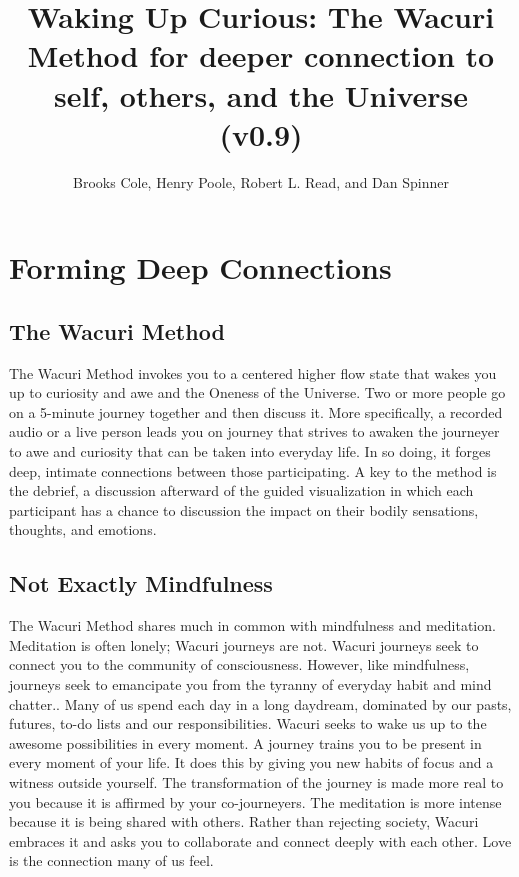 \documentclass[12pt]{book}
\begin{document}
\title{Waking Up Curious: The Wacuri Method for deeper connection to self, others, and the Universe (v0.9)}

\author{Brooks Cole, Henry Poole, Robert L. Read, and Dan Spinner}
\date{ }

\maketitle
\tableofcontents


\chapter{Forming Deep Connections}

\section{The Wacuri Method}

The Wacuri Method invokes  you  to a centered higher flow state that wakes you up to curiosity and awe and the Oneness of the Universe. Two or more people go on a 5-minute journey together and then discuss it. More specifically,  a recorded audio or a live person leads you on  journey that strives to awaken the journeyer to awe and curiosity that can be taken into everyday life. In so doing, it forges deep, intimate connections between those participating. A key to the method is the debrief, a discussion afterward of the guided visualization in which each participant has a chance to discussion the impact on their bodily sensations, thoughts, and emotions.


\section{Not Exactly Mindfulness}

The Wacuri Method shares much in common with mindfulness and meditation. Meditation is often lonely; Wacuri journeys are not. Wacuri journeys seek to connect you to the community of consciousness. However, like mindfulness, journeys seek to emancipate you from the tyranny of everyday habit and mind chatter.. Many of us spend each day in a long daydream, dominated by our pasts, futures, to-do lists and our responsibilities. Wacuri seeks to wake us up to the awesome possibilities in every moment. A journey trains you to be present in every moment of your life. It does this by giving you new habits of focus and a witness outside yourself. The transformation of the journey is made more real to you because it is affirmed by your co-journeyers. The meditation is more intense because it is being shared with others. Rather than rejecting society, Wacuri embraces it and asks you to collaborate  and connect deeply with each other. Love is	 the connection many of us feel.
\end{document}
